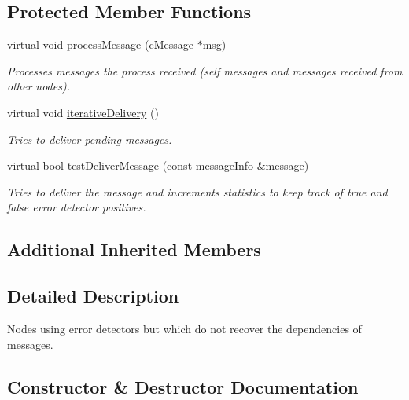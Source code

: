\subsection*{Protected Member Functions}
\begin{DoxyCompactItemize}
\item 
virtual void \hyperlink{class_node_without_recovery_a0b44132b4ebc650399711766cb050399}{process\+Message} (c\+Message $\ast$\hyperlink{_controller_8h_afa0f3b802fbc219228f7bb97996fa558}{msg})
\begin{DoxyCompactList}\small\item\em Processes messages the process received (self messages and messages received from other nodes). \end{DoxyCompactList}\item 
virtual void \hyperlink{class_node_without_recovery_a65e21db6d6b4e72b898fd567f8b4aee2}{iterative\+Delivery} ()
\begin{DoxyCompactList}\small\item\em Tries to deliver pending messages. \end{DoxyCompactList}\item 
virtual bool \hyperlink{class_node_without_recovery_a8cf83ec6d0af26e385dcde0bc03f5b6d}{test\+Deliver\+Message} (const \hyperlink{structures_8h_a7e7bdc1d2fff8a9436f2f352b2711ed6}{message\+Info} \&message)
\begin{DoxyCompactList}\small\item\em Tries to deliver the message and increments statistics to keep track of true and false error detector positives. \end{DoxyCompactList}\end{DoxyCompactItemize}
\subsection*{Additional Inherited Members}


\subsection{Detailed Description}
Nodes using error detectors but which do not recover the dependencies of messages. 

\subsection{Constructor \& Destructor Documentation}
\mbox{\label{class_node_without_recovery_a81c3fab3d91ae3bd6496b876d16694d8}} 
